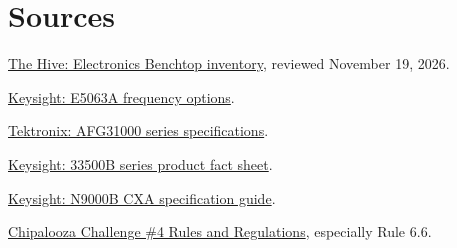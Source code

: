 \documentclass[10pt,letterpaper]{article}
\begin{document}
\section{Sources}

\begingroup
\small
\begin{enumerate}[label={[\arabic*]},nosep]
    \item \href{https://wiki.hivemakerspace.com/explore/electronics-benchtop/}{The Hive: Electronics Benchtop inventory}, reviewed November 19, 2026.
    \item \href{https://helpfiles.keysight.com/csg/e5063a/product_information/options.htm}{Keysight: E5063A frequency options}.
    \item \href{https://www.tek.com/en/datasheet/arbitrary-function-generators}{Tektronix: AFG31000 series specifications}.
    \item \href{https://www.keysight.com/content/dam/keysight/en/doc/ungate/product-fact-sheets/5991-0757.pdf}{Keysight: 33500B series product fact sheet}.
    \item \href{https://www.keysight.com/us/en/assets/9018-04781/technical-specifications/9018-04781.pdf}{Keysight: N9000B CXA specification guide}.
    \item \href{https://opencircuitdesign.com/chipalooza/rules-4.html}{Chipalooza Challenge \#4 Rules and Regulations}, especially Rule 6.6.
\end{enumerate}
\endgroup
\end{document}
